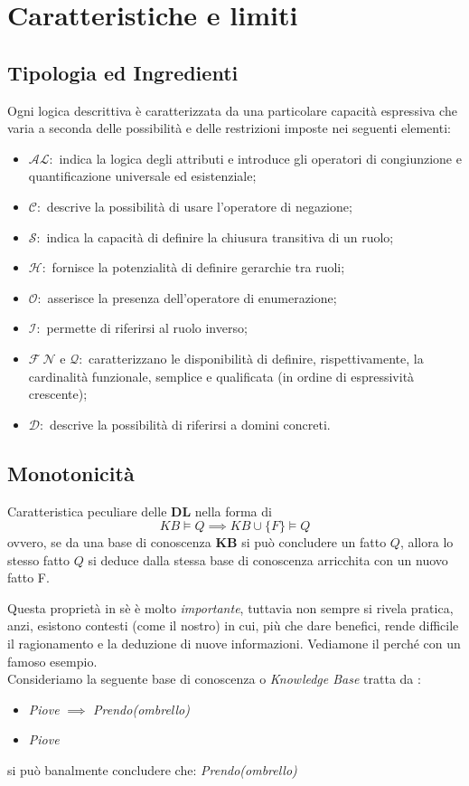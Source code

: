 \section{Caratteristiche e limiti}
\subsection{Tipologia ed Ingredienti}
Ogni logica descrittiva è caratterizzata da una particolare capacità espressiva che
varia a seconda delle possibilità e delle restrizioni imposte nei seguenti elementi:
\begin{itemize}
	\item $\mathcal{AL:}$ indica la logica degli attributi e introduce gli operatori 
	di congiunzione e quantificazione universale ed esistenziale;
	\item $\mathcal{C:}$ descrive la possibilità di usare l’operatore di negazione;
	\item $\mathcal{S:}$ indica la capacità di definire la chiusura transitiva di un ruolo;
	\item $\mathcal{H:}$ fornisce la potenzialità di definire gerarchie tra ruoli;
	\item $\mathcal{O:}$ asserisce la presenza dell'operatore di enumerazione;
	\item $\mathcal{I:}$ permette di riferirsi al ruolo inverso;
	\item $\mathcal{F}\ \mathcal{N}\text{ e }\mathcal{Q:}$ caratterizzano le disponibilità 
	di definire, rispettivamente, la cardinalità funzionale, semplice e qualificata (in ordine di espressività crescente);
	\item $\mathcal{D:}$ descrive la possibilità di riferirsi a domini concreti.
\end{itemize}
\subsection{Monotonicità}
Caratteristica peculiare delle \textbf{DL} nella forma di
\[ KB \models Q \implies KB \cup \{F\} \models Q\]
ovvero, se da una base di conoscenza \textbf{KB} si può concludere un fatto $ Q $, 
allora lo stesso fatto $ Q $ si deduce dalla stessa base di conoscenza arricchita con un nuovo fatto F.

Questa proprietà in sè è molto \textit{importante}, tuttavia non sempre si rivela pratica, anzi, 
esistono contesti (come il nostro) in cui, più che dare benefici, rende difficile il 
ragionamento e la deduzione di nuove informazioni.
Vediamone il perché con un famoso esempio.\\
Consideriamo la seguente base di conoscenza o \textit{Knowledge Base} tratta da \cite{PEAR}:     
\begin{itemize}
	\item[] \textit{Piove} $\implies$ \textit{Prendo(ombrello)}
	\item[] \textit{Piove}
\end{itemize}
si può banalmente concludere che: \textit{Prendo(ombrello)}

